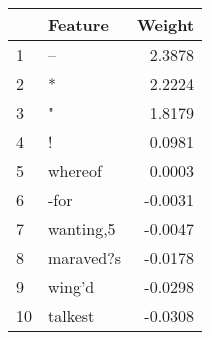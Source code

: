 \begin{tabular}{llr}
\toprule
{} &    Feature &  Weight \\
\midrule
1  &         -- &  2.3878 \\
2  &          * &  2.2224 \\
3  &          " &  1.8179 \\
4  &          ! &  0.0981 \\
5  &    whereof &  0.0003 \\
6  &       -for & -0.0031 \\
7  &  wanting,5 & -0.0047 \\
8  &  maraved?s & -0.0178 \\
9  &     wing'd & -0.0298 \\
10 &    talkest & -0.0308 \\
\bottomrule
\end{tabular}
